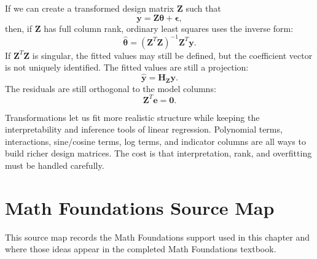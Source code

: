 {If we can create a transformed design matrix \(\mathbf{Z}\) such that
\begin{equation}
  \mathbf{y}=\mathbf{Z}\boldsymbol{\theta}+\boldsymbol{\epsilon},
\end{equation}
then, if \(\mathbf{Z}\) has full column rank, ordinary least squares uses the inverse form:
\begin{equation}
  \widehat{\boldsymbol{\theta}}
  =(\mathbf{Z}^T\mathbf{Z})^{-1}\mathbf{Z}^T\mathbf{y}.
\end{equation}
If \(\mathbf{Z}^T\mathbf{Z}\) is singular, the fitted values may still be defined, but the coefficient vector is not uniquely identified.
The fitted values are still a projection:
\begin{equation}
  \widehat{\mathbf{y}}=\mathbf{H}_{\mathbf{Z}}\mathbf{y}.
\end{equation}
The residuals are still orthogonal to the model columns:
\begin{equation}
  \mathbf{Z}^T\mathbf{e}=\mathbf{0}.
\end{equation}

Transformations let us fit more realistic structure while keeping the interpretability and inference tools of linear regression.  Polynomial terms, interactions, sine/cosine terms, log terms, and indicator columns are all ways to build richer design matrices.  The cost is that interpretation, rank, and overfitting must be handled carefully.

\section{Math Foundations Source Map}

This source map records the Math Foundations support used in this chapter and where those ideas appear in the completed Math Foundations textbook.

}

